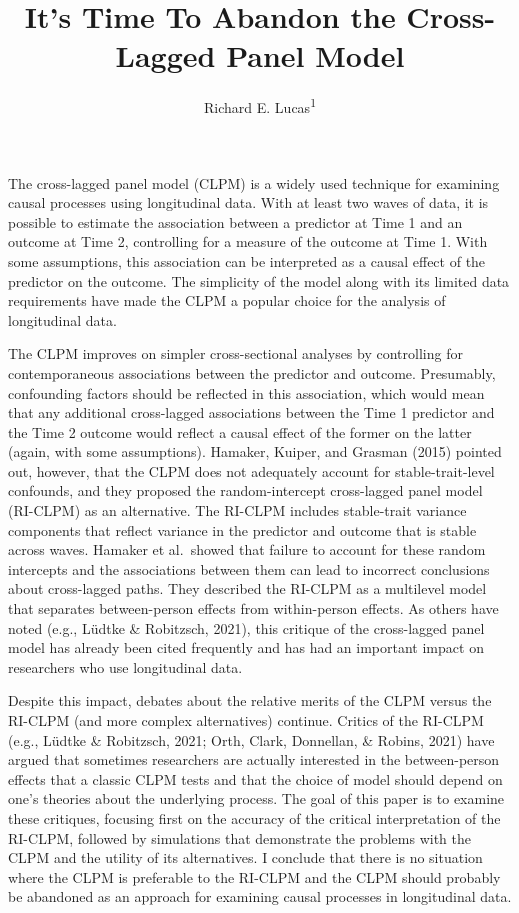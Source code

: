 \documentclass[
  english,
  man,floatsintext]{apa6}
\title{It's Time To Abandon the Cross-Lagged Panel Model}
\author{Richard E. Lucas\textsuperscript{1}}
\date{}
\affiliation{\vspace{0.5cm}\textsuperscript{1} Department of Psychology, Michigan State University}
\begin{document}
\maketitle

The cross-lagged panel model (CLPM) is a widely used technique for examining causal processes using longitudinal data. With at least two waves of data, it is possible to estimate the association between a predictor at Time 1 and an outcome at Time 2, controlling for a measure of the outcome at Time 1. With some assumptions, this association can be interpreted as a causal effect of the predictor on the outcome. The simplicity of the model along with its limited data requirements have made the CLPM a popular choice for the analysis of longitudinal data.

The CLPM improves on simpler cross-sectional analyses by controlling for contemporaneous associations between the predictor and outcome. Presumably, confounding factors should be reflected in this association, which would mean that any additional cross-lagged associations between the Time 1 predictor and the Time 2 outcome would reflect a causal effect of the former on the latter (again, with some assumptions). Hamaker, Kuiper, and Grasman (2015) pointed out, however, that the CLPM does not adequately account for stable-trait-level confounds, and they proposed the random-intercept cross-lagged panel model (RI-CLPM) as an alternative. The RI-CLPM includes stable-trait variance components that reflect variance in the predictor and outcome that is stable across waves. Hamaker et al.~showed that failure to account for these random intercepts and the associations between them can lead to incorrect conclusions about cross-lagged paths. They described the RI-CLPM as a multilevel model that separates between-person effects from within-person effects. As others have noted (e.g., Lüdtke \& Robitzsch, 2021), this critique of the cross-lagged panel model has already been cited frequently and has had an important impact on researchers who use longitudinal data.

Despite this impact, debates about the relative merits of the CLPM versus the RI-CLPM (and more complex alternatives) continue. Critics of the RI-CLPM (e.g., Lüdtke \& Robitzsch, 2021; Orth, Clark, Donnellan, \& Robins, 2021) have argued that sometimes researchers are actually interested in the between-person effects that a classic CLPM tests and that the choice of model should depend on one's theories about the underlying process. The goal of this paper is to examine these critiques, focusing first on the accuracy of the critical interpretation of the RI-CLPM, followed by simulations that demonstrate the problems with the CLPM and the utility of its alternatives. I conclude that there is no situation where the CLPM is preferable to the RI-CLPM and the CLPM should probably be abandoned as an approach for examining causal processes in longitudinal data.
\end{document}
